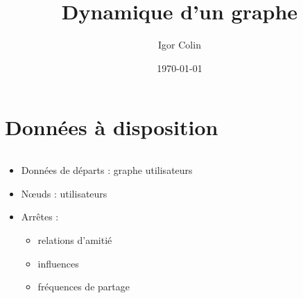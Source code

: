 \documentclass[c]{beamer}
\title{Dynamique d'un graphe}
\author{Igor Colin}
\date{\today}
\begin{document}
\maketitle

\section{Données à disposition}
\begin{frame}
    \begin{columns}
        \begin{column}{.5\textwidth}
            \begin{itemize}
                \item<1-> Données de départs : graphe utilisateurs
                \item<2-> N\oe{}uds : utilisateurs
                \item<3-> Arrêtes :
                    \begin{itemize}
                        \item<3-> relations d'amitié
                        \item<4-> influences
                        \item<5-> fréquences de partage
                    \end{itemize}
            \end{itemize}
        \end{column}
        \begin{column}{.5\textwidth}
\end{column}
\end{columns}
\end{frame}
\end{document}
